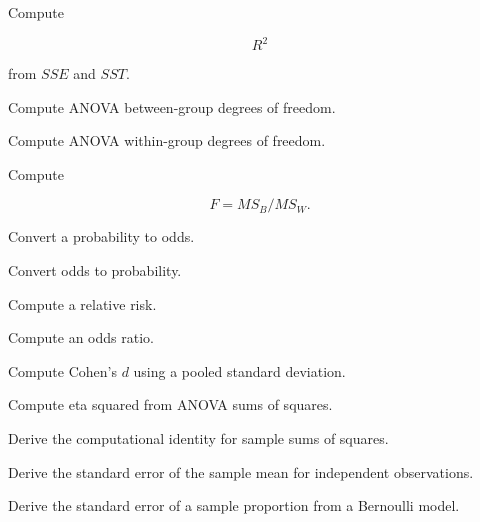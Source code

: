 \begin{exercise}[2]
Compute

\[
R^2
\]

from \(SSE\) and \(SST\).
\end{exercise}

\begin{exercise}[2]
Compute ANOVA between-group degrees of freedom.
\end{exercise}

\begin{exercise}[2]
Compute ANOVA within-group degrees of freedom.
\end{exercise}

\begin{exercise}[2]
Compute

\[
F
=
MS_B/MS_W.
\]
\end{exercise}

\begin{exercise}[2]
Convert a probability to odds.
\end{exercise}

\begin{exercise}[2]
Convert odds to probability.
\end{exercise}

\begin{exercise}[2]
Compute a relative risk.
\end{exercise}

\begin{exercise}[2]
Compute an odds ratio.
\end{exercise}

\begin{exercise}[2]
Compute Cohen's \(d\) using a pooled standard deviation.
\end{exercise}

\begin{exercise}[2]
Compute eta squared from ANOVA sums of squares.
\end{exercise}

\begin{exercise}[3]
Derive the computational identity for sample sums of squares.
\end{exercise}

\begin{exercise}[3]
Derive the standard error of the sample mean for independent observations.
\end{exercise}

\begin{exercise}[3]
Derive the standard error of a sample proportion from a Bernoulli model.
\end{exercise}

